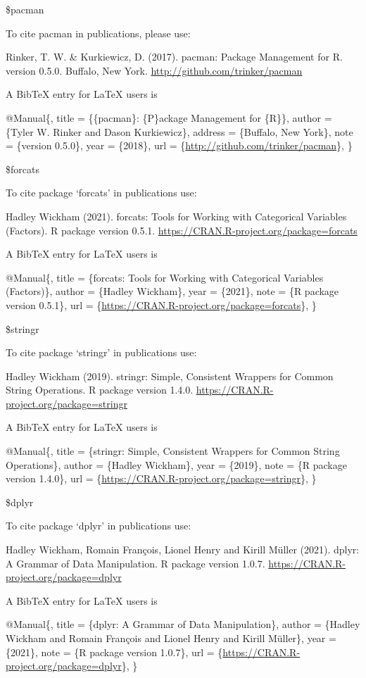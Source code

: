\documentclass[
]{article}
\begin{document}
\$pacman

To cite pacman in publications, please use:

Rinker, T. W. \& Kurkiewicz, D. (2017). pacman: Package Management for
R. version 0.5.0. Buffalo, New York.
\url{http://github.com/trinker/pacman}

A BibTeX entry for LaTeX users is

@Manual\{, title = \{\{pacman\}: \{P\}ackage Management for \{R\}\},
author = \{Tyler W. Rinker and Dason Kurkiewicz\}, address = \{Buffalo,
New York\}, note = \{version 0.5.0\}, year = \{2018\}, url =
\{\url{http://github.com/trinker/pacman}\}, \}

\$forcats

To cite package `forcats' in publications use:

Hadley Wickham (2021). forcats: Tools for Working with Categorical
Variables (Factors). R package version 0.5.1.
\url{https://CRAN.R-project.org/package=forcats}

A BibTeX entry for LaTeX users is

@Manual\{, title = \{forcats: Tools for Working with Categorical
Variables (Factors)\}, author = \{Hadley Wickham\}, year = \{2021\},
note = \{R package version 0.5.1\}, url =
\{\url{https://CRAN.R-project.org/package=forcats}\}, \}

\$stringr

To cite package `stringr' in publications use:

Hadley Wickham (2019). stringr: Simple, Consistent Wrappers for Common
String Operations. R package version 1.4.0.
\url{https://CRAN.R-project.org/package=stringr}

A BibTeX entry for LaTeX users is

@Manual\{, title = \{stringr: Simple, Consistent Wrappers for Common
String Operations\}, author = \{Hadley Wickham\}, year = \{2019\}, note
= \{R package version 1.4.0\}, url =
\{\url{https://CRAN.R-project.org/package=stringr}\}, \}

\$dplyr

To cite package `dplyr' in publications use:

Hadley Wickham, Romain François, Lionel Henry and Kirill Müller (2021).
dplyr: A Grammar of Data Manipulation. R package version 1.0.7.
\url{https://CRAN.R-project.org/package=dplyr}

A BibTeX entry for LaTeX users is

@Manual\{, title = \{dplyr: A Grammar of Data Manipulation\}, author =
\{Hadley Wickham and Romain François and Lionel Henry and Kirill
Müller\}, year = \{2021\}, note = \{R package version 1.0.7\}, url =
\{\url{https://CRAN.R-project.org/package=dplyr}\}, \}
\end{document}
